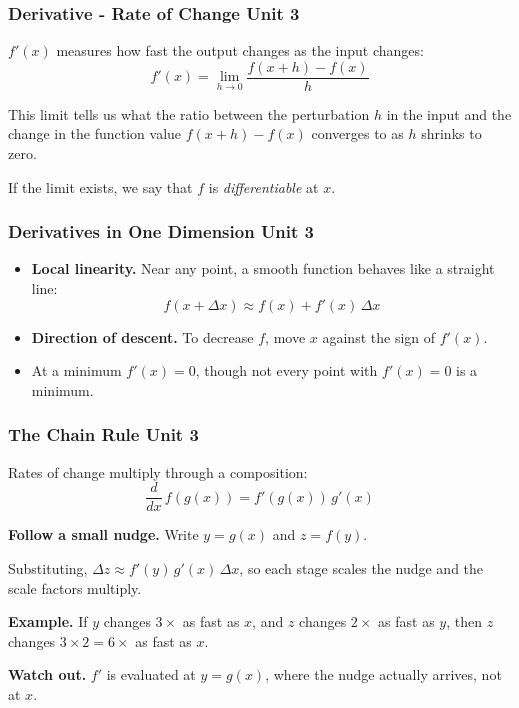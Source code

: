 \documentclass[12pt]{beamer}
\newcommand{\FrameTitle}[2]{\frametitle{#1 \hfill \small\textnormal{\textcolor{midgray}{#2}}}}
\newcommand{\vsp}{\vspace*{1em}}
\begin{document}
\begin{frame}\FrameTitle{Derivative - Rate of Change}{Unit 3}
    $f'(x)$ measures how fast the output changes as the
    input changes:
              $$f'(x) = \lim_{h \to 0} \dfrac{f(x+h)-f(x)}{h}$$

    \vsp
    This limit tells us what the ratio between the perturbation $h$
    in the input and the change in the function value $f(x+h)-f(x)$
    converges to as $h$ shrinks to zero.

    \vsp
    If the limit exists, we say that $f$ is \emph{differentiable} at $x$.
\end{frame}

\begin{frame}\FrameTitle{Derivatives in One Dimension}{Unit 3}
    \begin{itemize}
        \item \textbf{Local linearity.} Near any point, a smooth function
              behaves like a straight line:
              $$f(x+\Delta x) \approx f(x) + f'(x)\,\Delta x$$
        \item \textbf{Direction of descent.} To decrease $f$, move $x$ against
              the sign of $f'(x)$.
        \item At a minimum $f'(x)=0$, though not every
              point with $f'(x)=0$ is a minimum.
    \end{itemize}
\end{frame}

\begin{frame}\FrameTitle{The Chain Rule}{Unit 3}
    Rates of change multiply through a composition:
    \[
        \dfrac{d}{dx}\,f(g(x)) = f'(g(x))\,g'(x)
    \]

    \textbf{Follow a small nudge.} Write $y = g(x)$ and $z = f(y)$.
    \begin{center}
    \end{center}
    Substituting, $\Delta z \approx f'(y)\,g'(x)\,\Delta x$, so each stage
    scales the nudge and the scale factors multiply.

    \medskip
    \textbf{Example.} If $y$ changes $3\times$ as fast as $x$, and $z$ changes
    $2\times$ as fast as $y$, then $z$ changes $3 \times 2 = 6\times$ as fast as $x$.

    \medskip
    {\scriptsize\color{question}\textbf{Watch out.}
        $f'$ is evaluated at $y = g(x)$, where the nudge
        actually arrives, not at $x$.}

    \vfill
\end{frame}
\end{document}
